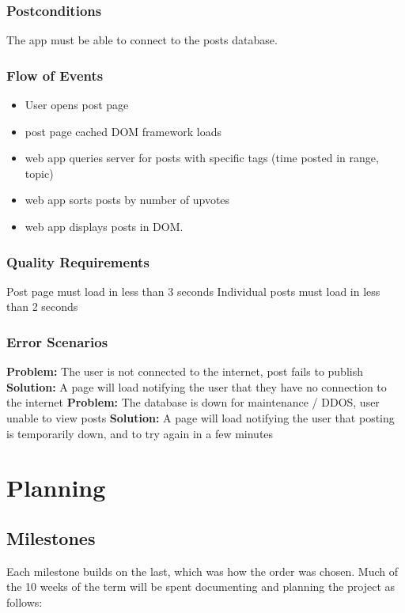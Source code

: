 \documentclass[12pt]{article}
\begin{document}
  \subsubsection{Postconditions}
  The app must be able to connect to the posts database.

  \subsubsection{Flow of Events}
  \begin{itemize}
    \item User opens post page
    \item post page cached DOM framework loads
    \item web app queries server for posts with specific tags (time posted in range, topic)
    \item web app sorts posts by number of upvotes
    \item web app displays posts in DOM.

  \end{itemize}

  \subsubsection{Quality Requirements}
  Post page must load in less than 3 seconds
  Individual posts must load in less than 2 seconds


  \subsubsection{Error Scenarios}
  \textbf{Problem:}
  The user is not connected to the internet, post fails to publish
  \textbf{Solution:}
    A page will load notifying the user that they have no connection to the internet
  \textbf{Problem:}
  The database is down for maintenance / DDOS, user unable to view posts
  \textbf{Solution:}
    A page will load notifying the user that posting is temporarily down, and to try again in a few minutes

\section{Planning}
\subsection{Milestones}
Each milestone builds on the last, which was how the order was chosen.
Much of the 10 weeks of the term will be spent documenting and planning the project as follows:
\end{document}
